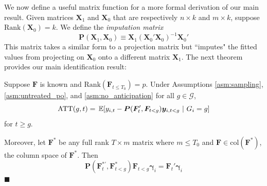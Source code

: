 \documentclass[12pt]{article}
\begin{document}
We now define a useful matrix function for a more formal derivation of our main result. Given matrices $\bm X_1$ and $\bm X_0$ that are respectively $n \times k$ and $m \times k$, suppose $\text{Rank}( \bm X_0) = k$. We define the \emph{imputation matrix} 
\begin{equation}
  \bm P(\bm X_1, \bm X_0) \equiv \bm X_1 (\bm X_0' \bm X_0)^{-1} \bm X_0'
\end{equation}
This matrix takes a similar form to a projection matrix but ``imputes" the fitted values from projecting on $\bm X_0$ onto a different matrix $\bm X_1$. The next theorem provides our main identification result:
\begin{theorem}\label{theorem:ATT_identification}
  Suppose $\bm{F}$ is known and $\text{Rank}(\bm{F}_{t \leq T_0}) = p$. Under Assumptions \ref{asm:sampling}, \ref{asm:untreated_po}, and \ref{asm:no_anticipation} for all $g \in \mathcal{G}$,
  \begin{equation}\label{eq:ATT_moments}
    \ATT(g,t) = \expec{y_{i,t} - \bm P(\bm{F}_{t}', \bm{F}_{t < g}) \bm y_{i,t < g}}{G_i = g}
  \end{equation}
  for $t \geq g$. 

  Moreover, let $\bm{F}^*$ be any full rank $T \times m$ matrix where $m \leq T_0$ and $\bm{F} \in \text{col}(\bm{F}^*)$, the column space of $\bm{F}^*$. Then 
  \begin{equation}\label{eq:rotation_invariance}
    \bm P(\bm{F}_t^{*'}, \bm{F}^*_{t < g}) \bm{F}_{t < g} \bm \gamma_i = \bm{F}_t' \bm \gamma_i
  \end{equation}
  $\blacksquare$
\end{theorem}
\end{document}
